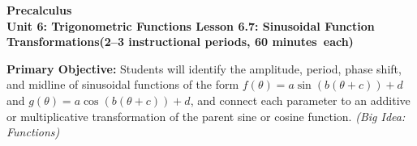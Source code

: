\documentclass[10pt]{article}
\newcommand{\CourseName}{Precalculus}
\newcommand{\MeetingLength}{60 minutes}
\newcommand{\UnitNumberName}{Unit 6: Trigonometric Functions \quad}
\newcommand{\LessonNumberName}{Lesson 6.7: Sinusoidal Function Transformations}
\begin{document}
\begin{center}
  {\Large\bfseries \CourseName} \\[4pt]
  {\small\bfseries \UnitNumberName \LessonNumberName \quad (2--3 instructional periods, \MeetingLength\ each)}
\end{center}

\begin{tcolorbox}[colback=sky, colframe=navy, boxrule=0.9pt, arc=2mm,
    left=2mm, right=2mm, top=1.5mm, bottom=1.5mm]
  \textbf{Primary Objective:} Students will identify the amplitude, period,
  phase shift, and midline of sinusoidal functions of the form
  $f(\theta)=a\sin(b(\theta+c))+d$ and $g(\theta)=a\cos(b(\theta+c))+d$,
  and connect each parameter to an additive or multiplicative transformation
  of the parent sine or cosine function.
  \textit{(Big Idea: Functions)}
\end{tcolorbox}

\vspace{0.08in}
\end{document}
